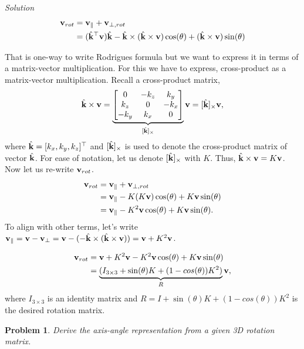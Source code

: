 \documentclass{article}
\newtheorem{prob}{Problem}
\numberwithin{prob}{section}
\newenvironment{solution}{\emph{Solution}}{}
\begin{document}
\begin{solution}
\begin{align}
  \mathbf{v}_{rot} &= \mathbf{v}_\parallel + \mathbf{v}_{\perp,rot} \\
             &= (\hat{\mathbf{k}}^\top  \mathbf{v}) \hat{\mathbf{k}} 
- \hat{\mathbf{k}} \times (\hat{\mathbf{k}} \times \mathbf{v}) \cos(\theta) + (\hat{\mathbf{k}} \times \mathbf{v})\sin(\theta)
\end{align}

That is one-way to write Rodrigues formula but we want to express it in terms of a matrix-vector multiplication. For this we have to express, cross-product as a matrix-vector multiplication. Recall a cross-product matrix,
\begin{align}
  \hat{\mathbf{k}} \times \mathbf{v} = \underbrace{\begin{bmatrix}
    0 & -k_z & k_y\\
    k_z & 0 & -k_x\\
    -k_y & k_x & 0
\end{bmatrix}}_{[\hat{\mathbf{k}}]_\times}\mathbf{v} = [\hat{\mathbf{k}}]_\times\mathbf{v},
\end{align}
where $\hat{\mathbf{k}} = [k_x, k_y, k_z]^\top$ and $[\hat{\mathbf{k}}]_\times$ is used to denote the cross-product matrix of vector $\hat{\mathbf{k}}$. For ease of notation, let us denote $[\hat{\mathbf{k}}]_\times$ with $K$. Thus, $\hat{\mathbf{k}} \times \mathbf{v} = K\mathbf{v}$. Now let us re-write $\mathbf{v}_{rot}$.
\begin{align}
  \mathbf{v}_{rot} &= \mathbf{v}_\parallel + \mathbf{v}_{\perp,rot} \\
             &= \mathbf{v}_\parallel - K (K \mathbf{v}) \cos(\theta) + K \mathbf{v} \sin(\theta)\\
             &= \mathbf{v}_\parallel - K^2 \mathbf{v} \cos(\theta) + K \mathbf{v} \sin(\theta).
\end{align}
To align with other terms, let's write $\mathbf{v}_\parallel = \mathbf{v} - \mathbf{v}_\perp = \mathbf{v} - (- \hat{\mathbf{k}} \times (\hat{\mathbf{k}} \times \mathbf{v})) = \mathbf{v} + K^2 \mathbf{v}$.

\begin{align}
  \mathbf{v}_{rot} &= \mathbf{v} + K^2 \mathbf{v} - K^2 \mathbf{v} \cos(\theta) + K \mathbf{v} \sin(\theta)\\
             &= \underbrace{(I_{3\times3} + \sin(\theta)K + (1-cos(\theta)) K^2)}_{R}\mathbf{v},
\end{align}
where $I_{3\times3}$ is an identity matrix and $R = I + \sin(\theta)K + (1-cos(\theta)) K^2$ is the desired rotation matrix.


\end{solution}

\begin{prob}
  Derive the axis-angle representation from a given 3D rotation matrix.
\end{prob}
\end{document}

